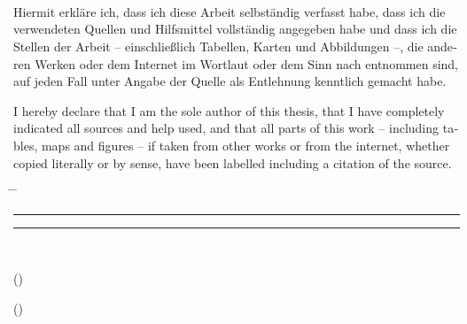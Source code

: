 \chapter*{\declarationlabel}

\tuinfthesisauthor\\
\tuinfthesisauthoraddress

\vspace*{1.2cm}

\begin{otherlanguage}{ngerman}
  Hiermit erkl\"are ich, dass ich diese Arbeit selbst\"andig verfasst habe, dass ich die verwendeten Quellen und Hilfsmittel vollst\"andig angegeben habe und dass ich die Stellen der Arbeit -- einschlie\ss{}lich Tabellen, Karten und Abbildungen --, die anderen Werken oder dem Internet im Wortlaut oder dem Sinn nach entnommen sind, auf jeden Fall unter Angabe der Quelle als Entlehnung kenntlich gemacht habe.\\
\end{otherlanguage}

\vspace*{1cm}

\begin{otherlanguage}{english}
  I hereby declare that I am the sole author of this thesis, that I have completely indicated all sources and help used, and that all parts of this work -- including tables, maps and figures -- if taken from other works or from the internet, whether copied literally or by sense, have been labelled including a citation of the source.
\end{otherlanguage}

\vspace*{2cm}
\begin{tabbing}%
    \hspace{58mm} \= \hspace{28mm} \= \hspace{58mm} \kill
    {\raggedright\rule{58mm}{0.5pt}} \> \> {\raggedright\rule{58mm}{0.5pt}} \\
    \begin{minipage}[t][0.5cm][t]{58mm}
	\vspace{0pt}\sffamily\thesistitlefontnormalsize
	\centering ()
    \end{minipage}
    \> \>
    \begin{minipage}[t][0.5cm][t]{58mm}
	\vspace{0pt}\sffamily\thesistitlefontnormalsize
	\centering ()
    \end{minipage}
\end{tabbing}

